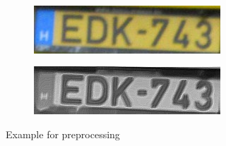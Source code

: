 \begin{figure}
\begin{subfigure}[b]{.45\textwidth}
    \end{subfigure}
    \hfill
    \\
    \begin{subfigure}[b]{.45\textwidth}
        \includegraphics[width=\textwidth]{figures/preprocessbefore3.jpg}
    \end{subfigure}
    \hfill
    \begin{subfigure}[b]{.45\textwidth}
        \includegraphics[width=\textwidth]{figures/preprocessafter3.jpg}
    \end{subfigure}
    \hfill
    \caption{Example for preprocessing}
    \label{fig:preprocessing-fig}
\end{figure}